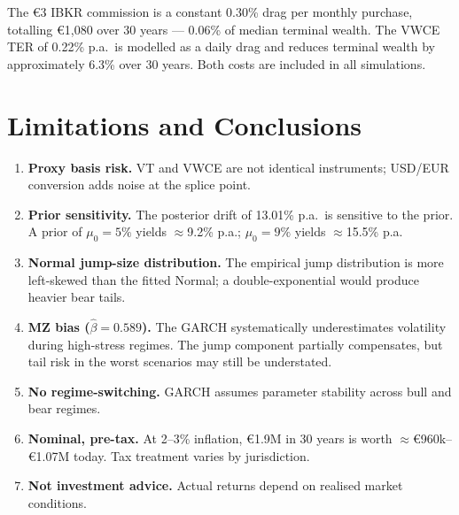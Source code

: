 \documentclass[11pt, a4paper]{article}
\begin{document}
The \euro{}3 IBKR commission is a constant 0.30\% drag per monthly purchase, totalling \euro{}1{,}080 over 30 years --- 0.06\% of median terminal wealth. The VWCE TER of 0.22\% p.a.\ is modelled as a daily drag and reduces terminal wealth by approximately 6.3\% over 30 years. Both costs are included in all simulations.

\section{Limitations and Conclusions}

\begin{warnbox}[title=Limitations]
\begin{enumerate}[leftmargin=1.5em, itemsep=3pt]
  \item \textbf{Proxy basis risk.} VT and VWCE are not identical instruments; USD/EUR conversion adds noise at the splice point.
  \item \textbf{Prior sensitivity.} The posterior drift of 13.01\% p.a.\ is sensitive to the prior. A prior of $\mu_0=5\%$ yields $\approx$9.2\% p.a.; $\mu_0=9\%$ yields $\approx$15.5\% p.a.
  \item \textbf{Normal jump-size distribution.} The empirical jump distribution is more left-skewed than the fitted Normal; a double-exponential would produce heavier bear tails.
  \item \textbf{MZ bias ($\hat\beta=0.589$).} The GARCH systematically underestimates volatility during high-stress regimes. The jump component partially compensates, but tail risk in the worst scenarios may still be understated.
  \item \textbf{No regime-switching.} GARCH assumes parameter stability across bull and bear regimes.
  \item \textbf{Nominal, pre-tax.} At 2--3\% inflation, \euro{}1.9M in 30 years is worth $\approx$\euro{}960k--\euro{}1.07M today. Tax treatment varies by jurisdiction.
  \item \textbf{Not investment advice.} Actual returns depend on realised market conditions.
\end{enumerate}
\end{warnbox}
\end{document}
